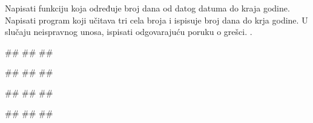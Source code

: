 \begin{Exercise}[label=FUN_27] 
Napisati funkciju  koja određuje broj dana od datog datuma do kraja
godine. Napisati program koji učitava tri cela broja i ispisuje broj
dana do krja godine. 
U slučaju neispravnog unosa, ispisati odgovarajuću poruku o grešci. 
.

\begin{miditest}
\begin{upotreba}{1}
#\naslovInt#
##
##
\end{upotreba}
\end{miditest}
\begin{miditest}
\begin{upotreba}{2}
#\naslovInt#
##
##
\end{upotreba}
\end{miditest}

\begin{miditest}
\begin{upotreba}{3}
#\naslovInt#
##
##
\end{upotreba}
\end{miditest}
\begin{miditest}
\begin{upotreba}{4}
#\naslovInt#
##
##
\end{upotreba}
\end{miditest}

\end{Exercise}


